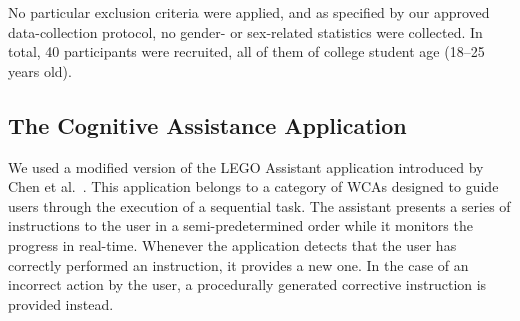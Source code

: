 \documentclass[10pt,letterpaper]{article}
\providecommand{\DIFaddtex}[1]{#1} %
\providecommand{\DIFdeltex}[1]{} %
\providecommand{\DIFaddbegin}{\protect\color{blue}} %
\providecommand{\DIFaddend}{\protect\color{black}} %
\providecommand{\DIFdelbegin}{\protect\color{red}} %
\providecommand{\DIFdelend}{\protect\color{black}} %
\providecommand{\DIFadd}[1]{\texorpdfstring{\DIFaddtex{#1}}{#1}} %
\providecommand{\DIFdel}[1]{\texorpdfstring{\DIFdeltex{#1}}{}} %
\newcommand{\DIFscaledelfig}{0.5}
\newlength{\DIFdelgraphicswidth} %
\newlength{\DIFdelgraphicsheight} %
\newcommand{\DIFaddincludegraphics}[2][]{{\color{blue}\fbox{\DIFOincludegraphics[#1]{#2}}}} %
\newcommand{\DIFdelincludegraphics}[2][]{%
\sbox{\DIFdelgraphicsbox}{\DIFOincludegraphics[#1]{#2}}%
\settoboxwidth{\DIFdelgraphicswidth}{\DIFdelgraphicsbox} %
\settoboxtotalheight{\DIFdelgraphicsheight}{\DIFdelgraphicsbox} %
\scalebox{\DIFscaledelfig}{%
\parbox[b]{\DIFdelgraphicswidth}{\usebox{\DIFdelgraphicsbox}\\[-\baselineskip] \rule{\DIFdelgraphicswidth}{0em}}\llap{\resizebox{\DIFdelgraphicswidth}{\DIFdelgraphicsheight}{%
\setlength{\unitlength}{\DIFdelgraphicswidth}%
\begin{picture}(1,1)%
\thicklines\linethickness{2pt} %
{\color[rgb]{1,0,0}\put(0,0){\framebox(1,1){}}}%
{\color[rgb]{1,0,0}\put(0,0){\line( 1,1){1}}}%
{\color[rgb]{1,0,0}\put(0,1){\line(1,-1){1}}}%
\end{picture}%
}\hspace*{3pt}}} %
} %
\DeclareRobustCommand{\DIFaddbegin}{\DIFOaddbegin \let\includegraphics\DIFaddincludegraphics} %
\DeclareRobustCommand{\DIFaddend}{\DIFOaddend \let\includegraphics\DIFOincludegraphics} %
\DeclareRobustCommand{\DIFdelbegin}{\DIFOdelbegin \let\includegraphics\DIFdelincludegraphics} %
\DeclareRobustCommand{\DIFdelend}{\DIFOaddend \let\includegraphics\DIFOincludegraphics} %
\begin{document}
\DIFaddend No particular exclusion criteria were applied\DIFaddbegin \DIFadd{, and as specified by our approved data-collection protocol, no gender- or sex-related statistics were collected}\DIFaddend .
In total, 40 participants were recruited, all of them of college student age (\numrange{18}{25} years old).

\subsection{The Cognitive Assistance Application}

We used a modified version of the LEGO Assistant application introduced by Chen et al.~\cite{Chen:EarlyImplementation}.
This application belongs to a category of \DIFdelbegin \DIFdel{\emph{WCA}s that are }\DIFdelend \DIFaddbegin \DIFadd{WCAs }\DIFaddend designed to guide users through the execution of a sequential task.
\DIFdelbegin \DIFdel{Such applications constitute ``\emph{conversational computing tasks}'' in the taxonomy proposed by Dabrowski \& Munson~\cite{dabrowsky:2011:40years}.
A set of instructions are to be performed by }\DIFdelend %
\DIFaddbegin \DIFadd{The assistant presents a series of instructions to }\DIFaddend the user in a semi-predetermined order \DIFdelbegin \DIFdel{.
The results of the user performing these instructions are provided as inputs to the system.
These inputs may either be correct, in which case the system proceeds to output the next instruction, or incorrect , in which case }\DIFdelend \DIFaddbegin \DIFadd{while it monitors the progress in real-time.
Whenever the application detects that the user has correctly performed an instruction, it provides a new one.
In the case of an incorrect action by the user, }\DIFaddend a procedurally generated corrective \DIFdelbegin \DIFdel{step that fixes the mistake is provided to the user.
}\DIFdelend \DIFaddbegin \DIFadd{instruction is provided instead.
}\DIFaddend 
\end{document}
